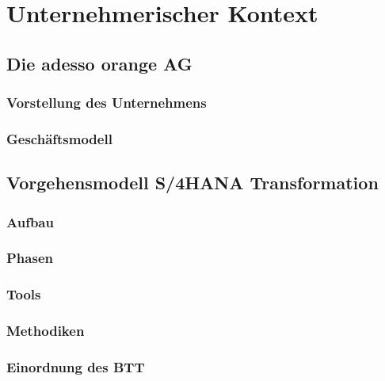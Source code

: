 \section{Unternehmerischer Kontext}
\subsection{Die adesso orange AG}
\subsubsection{Vorstellung des Unternehmens}

\subsubsection{Geschäftsmodell}

\subsection{Vorgehensmodell S/4HANA Transformation}
\subsubsection{Aufbau}

\subsubsection{Phasen}

\subsubsection{Tools}

\subsubsection{Methodiken}

\subsubsection{Einordnung des BTT}